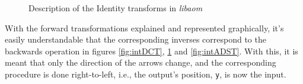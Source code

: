 
\begin{figure}[!htbp]
    \centering
    
    \caption{Description of the Identity transforms in \emph{libaom}}
    \label{fig:intIDEN}
\end{figure}

With the forward transformations explained and represented graphically, it's easily understandable that the corresponding inverses correspond to the backwards operation in figures \ref{fig:intDCT}, \ref{fig:intIDEN} and \ref{fig:intADST}. With this, it is meant that only the direction of the arrows change, and the corresponding procedure is done right-to-left, i.e., the output's position, \texttt{y}, is now the input.


\clearpage
\printbibliography[heading=subbibliography]
